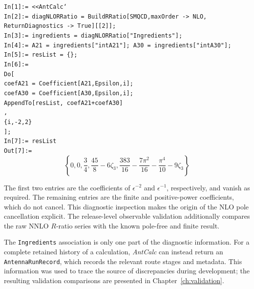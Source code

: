 \begin{mdframed}[backgroundcolor=gray!10, linewidth=0pt]
    \texttt{In[1]:= <<AntCalc`}\\
    \hfill
    \texttt{In[2]:= diagNLORRatio = BuildRRatio[SMQCD,maxOrder -> NLO,\\ReturnDiagnostics -> True][[2]];}\\
    \hfill
    \texttt{In[3]:= ingredients = diagNLORRatio["Ingredients"];}\\
    \hfill
    \texttt{In[4]:= A21 = ingredients["intA21"]; A30 = ingredients["intA30"];}\\
    \hfill
    \texttt{In[5]:= resList = \{\};}\\
    \hfill
    \texttt{In[6]:= \\Do[\\
                        coefA21 = Coefficient[A21,Epsilon,i];\\
                        coefA30 = Coefficient[A30,Epsilon,i];\\
                        AppendTo[resList, coefA21+coefA30]\\
                        ,\\
                        \{i,-2,2\}\\
                        ];}\\
    \hfill
    \texttt{In[7]:= resList}\\
    \hfill
    \texttt{Out[7]:=}
        \begin{equation*}
            \left\{0,0,\frac34,\frac{45}8-6\zeta_3,\frac{383}{16}-\frac{7\pi^2}{16}-\frac{\pi^4}{10}-9\zeta_3\right\}
        \end{equation*}
\end{mdframed}

The first two entries are the coefficients of $\epsilon^{-2}$ and $\epsilon^{-1}$, 
respectively, and vanish as required. The remaining entries are the finite and 
positive-power coefficients, which do not cancel. This diagnostic 
inspection makes the origin of the NLO pole cancellation explicit. The release-level
observable validation additionally compares the raw NNLO $R$-ratio series with the
known pole-free and finite result.
\fi

The \texttt{Ingredients} association is only one part of the diagnostic information. For a
complete retained history of a calculation, \textit{AntCalc} can instead return an
\texttt{AntennaRunRecord}, which records the relevant route stages and metadata. This
information was used to trace the source of discrepancies during development; the resulting
validation comparisons are presented in Chapter~\ref{ch:validation}.

